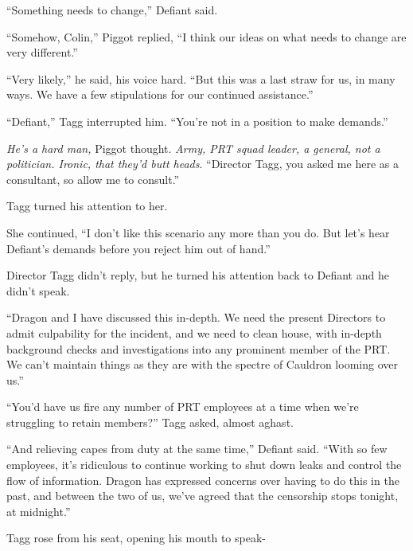``Something needs to change,'' Defiant said.



``Somehow, Colin,'' Piggot replied, ``I think our ideas on what needs to change are very different.''



``Very likely,'' he said, his voice hard.  ``But this was a last straw for us, in many ways.  We have a few stipulations for our continued assistance.''



``Defiant,'' Tagg interrupted him.  ``You're not in a position to make demands.''



\emph{He's a hard man,} Piggot thought.  \emph{Army, PRT squad leader, a general, not a politician.  Ironic, that they'd butt heads}.  ``Director Tagg, you asked me here as a consultant, so allow me to consult.''



Tagg turned his attention to her.



She continued, ``I don't like this scenario any more than you do.  But let's hear Defiant's demands before you reject him out of hand.''



Director Tagg didn't reply, but he turned his attention back to Defiant and he didn't speak.



``Dragon and I have discussed this in-depth.  We need the present Directors to admit culpability for the incident, and we need to clean house, with in-depth background checks and investigations into any prominent member of the PRT.  We can't maintain things as they are with the spectre of Cauldron looming over us.''



``You'd have us fire any number of PRT employees at a time when we're struggling to retain members?''  Tagg asked, almost aghast.



``And relieving capes from duty at the same time,'' Defiant said.  ``With so few employees, it's ridiculous to continue working to shut down leaks and control the flow of information.  Dragon has expressed concerns over having to do this in the past, and between the two of us, we've agreed that the censorship stops tonight, at midnight.''



Tagg rose from his seat, opening his mouth to speak-



